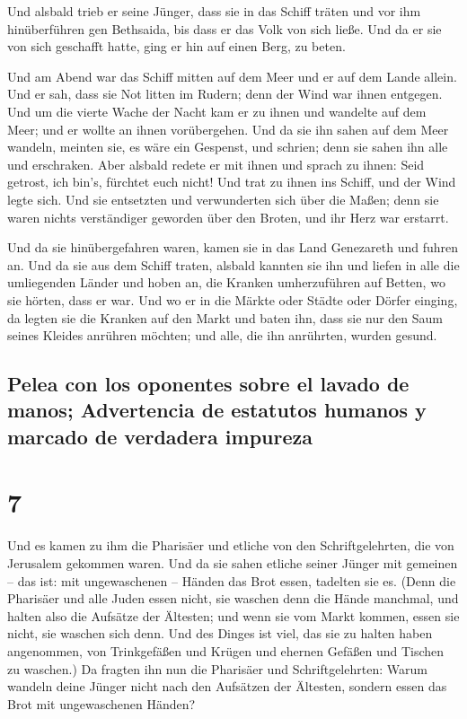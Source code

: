  Und alsbald trieb er seine Jünger, dass sie in das
Schiff träten und vor ihm hinüberführen gen Bethsaida, bis dass er das
Volk von sich ließe.  Und da er sie von sich geschafft
hatte, ging er hin auf einen Berg, zu beten.

 Und am Abend war das Schiff mitten auf dem Meer und er
auf dem Lande allein.  Und er sah, dass sie Not litten im
Rudern; denn der Wind war ihnen entgegen. Und um die vierte Wache der
Nacht kam er zu ihnen und wandelte auf dem Meer;  und er
wollte an ihnen vorübergehen. Und da sie ihn sahen auf dem Meer wandeln,
meinten sie, es wäre ein Gespenst, und schrien;  denn sie
sahen ihn alle und erschraken. Aber alsbald redete er mit ihnen und
sprach zu ihnen: Seid getrost, ich bin's, fürchtet euch nicht!
 Und trat zu ihnen ins Schiff, und der Wind legte sich.
Und sie entsetzten und verwunderten sich über die Maßen; 
denn sie waren nichts verständiger geworden über den Broten, und ihr
Herz war erstarrt.

 Und da sie hinübergefahren waren, kamen sie in das Land
Genezareth und fuhren an.  Und da sie aus dem Schiff
traten, alsbald kannten sie ihn  und liefen in alle die
umliegenden Länder und hoben an, die Kranken umherzuführen auf Betten,
wo sie hörten, dass er war.  Und wo er in die Märkte oder
Städte oder Dörfer einging, da legten sie die Kranken auf den Markt und
baten ihn, dass sie nur den Saum seines Kleides anrühren möchten; und
alle, die ihn anrührten, wurden gesund.

\hypertarget{pelea-con-los-oponentes-sobre-el-lavado-de-manos-advertencia-de-estatutos-humanos-y-marcado-de-verdadera-impureza}{%
\subsection{Pelea con los oponentes sobre el lavado de manos;
Advertencia de estatutos humanos y marcado de verdadera
impureza}\label{pelea-con-los-oponentes-sobre-el-lavado-de-manos-advertencia-de-estatutos-humanos-y-marcado-de-verdadera-impureza}}

\hypertarget{section-6}{%
\section{7}\label{section-6}}

 Und es kamen zu ihm die Pharisäer und etliche von den
Schriftgelehrten, die von Jerusalem gekommen waren.  Und
da sie sahen etliche seiner Jünger mit gemeinen -- das ist: mit
ungewaschenen -- Händen das Brot essen, tadelten sie es. 
(Denn die Pharisäer und alle Juden essen nicht, sie waschen denn die
Hände manchmal, und halten also die Aufsätze der Ältesten;
 und wenn sie vom Markt kommen, essen sie nicht, sie
waschen sich denn. Und des Dinges ist viel, das sie zu halten haben
angenommen, von Trinkgefäßen und Krügen und ehernen Gefäßen und Tischen
zu waschen.)  Da fragten ihn nun die Pharisäer und
Schriftgelehrten: Warum wandeln deine Jünger nicht nach den Aufsätzen
der Ältesten, sondern essen das Brot mit ungewaschenen Händen?

